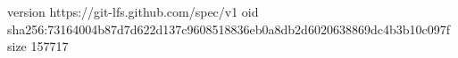 version https://git-lfs.github.com/spec/v1
oid sha256:73164004b87d7d622d137c9608518836eb0a8db2d6020638869dc4b3b10c097f
size 157717
